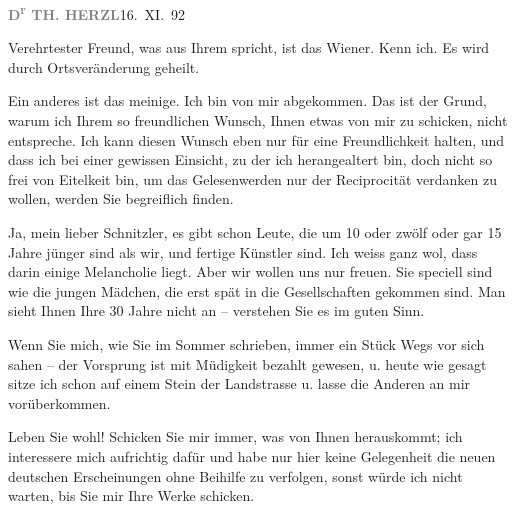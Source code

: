 \pstart
           \textcolor{gray}{\textbf{D\textsuperscript{r}{ }TH. HERZL}}\hfill 16. XI. 92\pend
           
\pstart{}Verehrtester Freund,\pend\vspace{0.5em}
\pstart
           was aus Ihrem \label{K_L03824-1v}\label{K_L03824-1} spricht,
               ist das Wiener\label{K_L03824-2v}\label{K_L03824-2}.
      Kenn ich. Es wird durch Ortsveränderung
      geheilt.\pend
           
\pstart
           Ein anderes ist das meinige.
      Ich bin von mir abgekommen.
      Das ist der Grund, warum ich
      Ihrem so freundlichen Wunsch,
      Ihnen etwas von mir zu schicken,
      nicht entspreche. Ich kann diesen
      Wunsch eben nur für eine
      Freundlichkeit halten, und dass
      ich bei einer gewissen Einsicht,
      zu der ich herangealtert bin,
      doch nicht so frei von Eitelkeit
      bin, um das Gelesenwerden nur
                  {\pb}der Reciprocität verdanken zu
      wollen, werden Sie begreiflich
      finden.\pend
           
\pstart
           Ja, mein lieber Schnitzler, es gibt
      schon Leute, die um 10 oder
      zwölf oder gar 15 Jahre jünger
      sind als wir, und fertige
      Künstler sind. Ich weiss ganz
      wol, dass darin einige Melancholie
      liegt. Aber wir wollen uns nur
      freuen. Sie speciell sind wie die
      jungen Mädchen, die erst spät
      in die Gesellschaften gekommen sind.
      Man sieht Ihnen Ihre 30 Jahre
      nicht an – verstehen Sie es im
      guten Sinn.\pend
           
\pstart
           Wenn Sie mich, wie Sie im Sommer
      schrieben, immer ein Stück Wegs
      vor sich sahen – der Vorsprung
      ist mit Müdigkeit bezahlt gewesen,
      u. heute wie gesagt sitze {\pb}ich schon auf einem Stein
      der Landstrasse u. lasse die
      Anderen an mir vorüberkommen.\pend
           
\pstart
           Leben Sie wohl! Schicken Sie
      mir immer, was von Ihnen
      herauskommt; ich interessere mich
      aufrichtig dafür und habe nur
      hier keine Gelegenheit die neuen
      deutschen Erscheinungen  ohne
      Beihilfe zu verfolgen, sonst würde
      ich nicht warten, bis Sie mir
      Ihre Werke schicken.\pend
           
